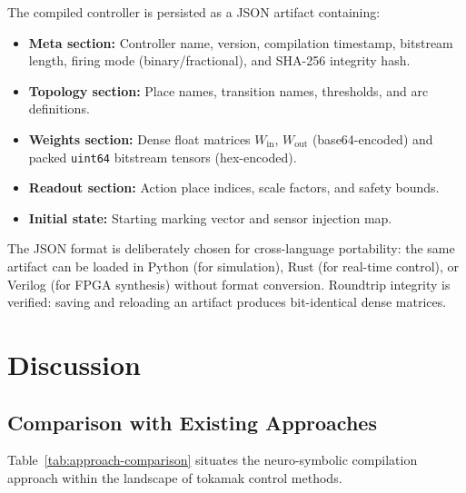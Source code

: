 \documentclass[12pt]{article}
\newcommand{\code}[1]{\texttt{#1}}
\begin{document}
The compiled controller is persisted as a JSON artifact containing:

\begin{itemize}
  \item \textbf{Meta section:} Controller name, version, compilation
    timestamp, bitstream length, firing mode (binary/fractional), and
    SHA-256 integrity hash.
  \item \textbf{Topology section:} Place names, transition names,
    thresholds, and arc definitions.
  \item \textbf{Weights section:} Dense float matrices
    $W_{\mathrm{in}}$, $W_{\mathrm{out}}$ (base64-encoded) and packed
    \code{uint64} bitstream tensors (hex-encoded).
  \item \textbf{Readout section:} Action place indices, scale factors,
    and safety bounds.
  \item \textbf{Initial state:} Starting marking vector and sensor
    injection map.
\end{itemize}

The JSON format is deliberately chosen for cross-language portability:
the same artifact can be loaded in Python (for simulation), Rust (for
real-time control), or Verilog (for FPGA synthesis) without format
conversion.  Roundtrip integrity is verified: saving and reloading an
artifact produces bit-identical dense matrices.


\section{Discussion}
\label{sec:discussion}

\subsection{Comparison with Existing Approaches}

Table~\ref{tab:approach-comparison} situates the neuro-symbolic
compilation approach within the landscape of tokamak control methods.
\end{document}
